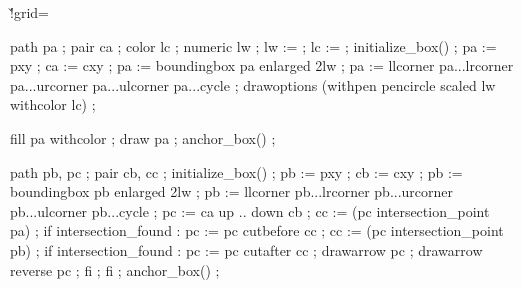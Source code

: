

\ifx\basegrid\undefined \else {}\v!grid=\basegrid \fi




  path pa ; pair ca ; color lc ; numeric lw ;
  lw :=  ;
  lc :=  ;
  initialize_box() ;
  pa := pxy ; ca := cxy ; pa := boundingbox pa enlarged 2lw ;
  pa := llcorner pa...lrcorner pa...urcorner pa...ulcorner pa...cycle ;
  drawoptions (withpen pencircle scaled lw withcolor lc) ;
\stopuseMPgraphic

  fill pa withcolor  ; draw pa ;
  anchor_box() ;
\stopMPpositiongraphic

  path pb, pc ; pair cb, cc ;
  initialize_box() ;
  pb := pxy ; cb := cxy ; pb := boundingbox pb enlarged 2lw ;
  pb := llcorner pb...lrcorner pb...urcorner pb...ulcorner pb...cycle ;
  pc := ca {up} .. {down} cb ;
  cc := (pc intersection_point pa) ;
  if intersection_found :
    pc := pc cutbefore cc ;
    cc := (pc intersection_point pb) ;
    if intersection_found :
      pc := pc cutafter cc ;
      drawarrow pc ; drawarrow reverse pc ;
    fi ;
  fi ;
  anchor_box() ;
\stopMPpositiongraphic


